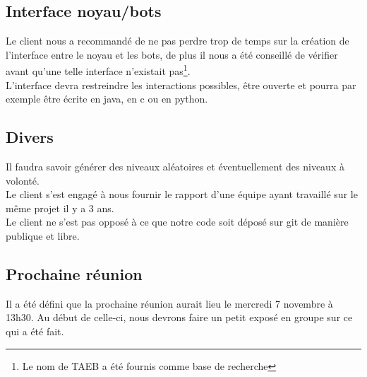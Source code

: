 \documentclass{article}
\begin{document}
\subsection*{Interface noyau/bots}
Le client nous a recommandé de ne pas perdre trop de temps sur la création de l'interface entre le noyau et les bots, de plus il nous a été conseillé de vérifier avant qu'une telle interface n'existait pas\footnote{Le nom de TAEB a été fournis comme base de recherche}.\\
L'interface devra restreindre les interactions possibles, être ouverte et pourra par exemple être écrite en java, en c ou en python.

\subsection*{Divers}
Il faudra savoir générer des niveaux aléatoires et éventuellement des niveaux à volonté.\\
Le client s'est engagé à nous fournir le rapport d'une équipe ayant travaillé sur le même projet il y a 3 ans.\\
Le client ne s'est pas opposé à ce que notre code soit déposé sur git de manière publique et libre.

\subsection*{Prochaine réunion}
Il a été défini que la prochaine réunion aurait lieu le mercredi 7 novembre à 13h30. Au début de celle-ci, nous devrons faire un petit exposé en groupe sur ce qui a été fait.
\end{document}
